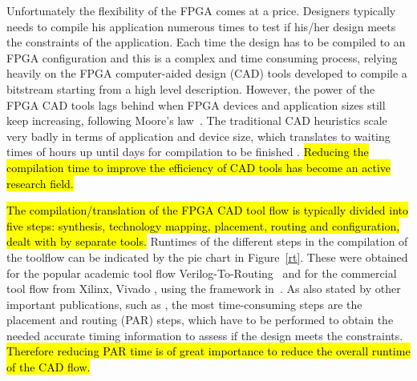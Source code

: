 \documentclass[a4paper,oneside,12pt]{article}
\begin{document}
Unfortunately the flexibility of the FPGA comes at a price. Designers typically needs to compile his application numerous times to test if his/her design meets the constraints of the application. Each time the design has to be compiled to an FPGA configuration and this is a complex and time consuming process, relying heavily on the FPGA computer-aided design (CAD) tools developed to compile a bitstream starting from a high level description.
However, the power of the FPGA CAD tools lags behind when FPGA devices and application sizes still keep increasing, following Moore's law~\cite{shannon2015technology}. The traditional CAD heuristics scale very badly in terms of application and device size, which translates to waiting times of hours up until days for compilation to be finished \cite{murray2015timing}.
\hl{Reducing the compilation time to improve the efficiency of CAD tools has become an active research field.}

\hl{The compilation/translation of the FPGA CAD tool flow is typically divided into five steps: synthesis, technology mapping, placement, routing and configuration, dealt with by separate tools. } %
Runtimes of the different steps in the compilation of the toolflow can be indicated by the pie chart in Figure~\ref{rt}. These were obtained for the popular academic tool flow Verilog-To-Routing~\cite{luu2014vtr} and for the commercial tool flow from Xilinx, Vivado \cite{feist2012vivado}, using the framework in~\cite{vansteenkiste2015analyzing}. As also stated by other important publications, such as \cite{murray2015timing}, the most time-consuming steps are the placement and routing (PAR) steps, which have to be performed to obtain the needed accurate timing information to assess if the design meets the constraints.
\hl{Therefore reducing PAR time is of great importance to reduce the overall runtime of the CAD flow.}

\end{document}
